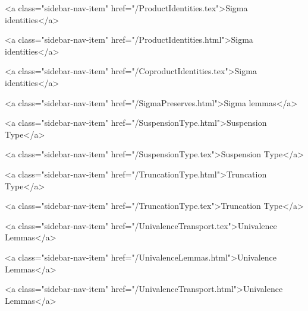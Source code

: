       
    
      
        
          <a class="sidebar-nav-item" href="/ProductIdentities.tex">Sigma identities</a>
        
      
    
      
        
          <a class="sidebar-nav-item" href="/ProductIdentities.html">Sigma identities</a>
        
      
    
      
        
          <a class="sidebar-nav-item" href="/CoproductIdentities.tex">Sigma identities</a>
        
      
    
      
        
          <a class="sidebar-nav-item" href="/SigmaPreserves.html">Sigma lemmas</a>
        
      
    
      
        
          <a class="sidebar-nav-item" href="/SuspensionType.html">Suspension Type</a>
        
      
    
      
        
          <a class="sidebar-nav-item" href="/SuspensionType.tex">Suspension Type</a>
        
      
    
      
        
          <a class="sidebar-nav-item" href="/TruncationType.html">Truncation Type</a>
        
      
    
      
        
          <a class="sidebar-nav-item" href="/TruncationType.tex">Truncation Type</a>
        
      
    
      
        
          <a class="sidebar-nav-item" href="/UnivalenceTransport.tex">Univalence Lemmas</a>
        
      
    
      
        
          <a class="sidebar-nav-item" href="/UnivalenceLemmas.html">Univalence Lemmas</a>
        
      
    
      
        
          <a class="sidebar-nav-item" href="/UnivalenceTransport.html">Univalence Lemmas</a>
        
